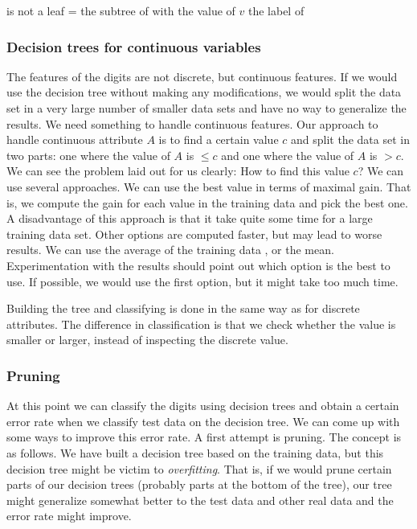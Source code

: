 \documentclass[10pt,a4paper]{article}
\begin{document}
\begin{codebox}
\li \While {} is not a leaf \Do
\li 	{} = the subtree of  with the value of $v$
	\End
\li 	\Return the label of 
\end{codebox}

\subsubsection{Decision trees for continuous variables}
The features of the digits are not discrete, but continuous features. If we would use the decision tree without making any modifications, we would split the data set in a very large number of smaller data sets and have no way to generalize the results. We need something to handle continuous features. Our approach to handle continuous attribute $A$ is to find a certain value $c$ and split the data set in two parts: one where the value of $A$ is $\leq c$ and one where the value of $A$ is $> c$. We can see the problem laid out for us clearly: How to find this value $c$? We can use several approaches. We can use the best value in terms of maximal gain. That is, we compute the gain for each value in the training data and pick the best one. A disadvantage of this approach is that it take quite some time for a large training data set. Other options are computed faster, but may lead to worse results. We can use the average of the training data , or the mean. Experimentation with the results should point out which option is the best to use. If possible, we would use the first option, but it might take too much time. 

Building the tree and classifying is done in the same way as for discrete attributes. The difference in classification is that we check whether the value is smaller or larger, instead of inspecting the discrete value.
\subsubsection{Pruning}
At this point we can classify the digits using decision trees and obtain a certain error rate when we classify test data on the decision tree. We can come up with some ways to improve this error rate. A first attempt is pruning. The concept is as follows. We have built a decision tree based on the training data, but this decision tree might be victim to \emph{overfitting}. That is, if we would prune certain parts of our decision trees (probably parts at the bottom of the tree), our tree might generalize somewhat better to the test data and other real data and the error rate might improve. 
\end{document}
